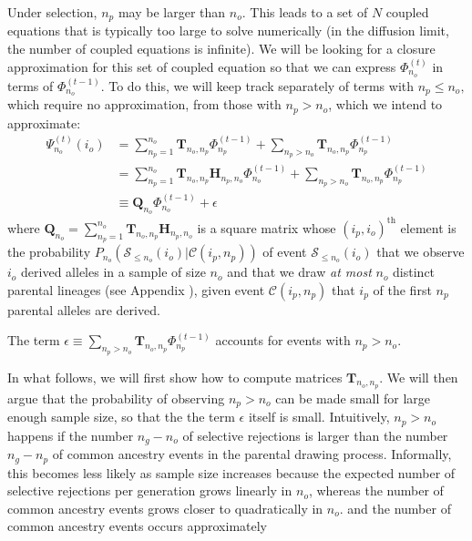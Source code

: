 \documentclass[9pt,twocolumn,twoside,lineno]{gsajnl}
\newcommand{\afs}[2]{\Phi_{#1}^{(#2)}}
\newcommand{\afsPsi}[2]{\Psi_{#1}^{(#2)}}
\newcommand{\ms}{\mathcal{S}}
\begin{document}
Under selection, $n_{p}$ may be larger than $n_o$. This leads to a set of $N$ coupled equations that is typically too large to solve numerically (in the diffusion limit, the number of coupled equations is
infinite). We will be looking for a closure approximation for this set of coupled equation so that we can express $\afs{n_o}{t}$ in terms of $\afs{n_o}{t-1}$. To do this, we will keep track separately of terms with $n_p \leq n_o,$ which require no approximation, from those with $n_p>n_o$, which we intend to approximate:   
\begin{equation}
\begin{split}
  \afsPsi{n_o}{t}(i_o)
  &= \sum_{n_p=1}^{n_{o}} \mathbf{T}_{n_o,n_p}  \afs{n_p}{t-1}+ \sum_{n_p> n_o }  \mathbf{T}_{n_o,n_p} \afs{n_p}{t-1} \\
  &=      \sum_{n_p=1}^{n_{o}} \mathbf{T}_{n_o,n_p} \mathbf{H}_{n_p,n_o} \afs{n_o}{t-1}+ \sum_{n_p> n_o }  \mathbf{T}_{n_o,n_p} \afs{n_p}{t-1} \\
  &\equiv \mathbf{Q}_{n_o}                                               \afs{n_o}{t-1}+ \epsilon
\end{split}
\label{eq_truncated}
\end{equation}
where $\mathbf{Q}_{n_o} =  \sum_{n_p=1}^{n_{o}} \mathbf{T}_{n_o,n_p} \mathbf{H}_{n_p,n_o}$ is a
square matrix whose $(i_p,i_o)^\text{th}$ element is the probability $P_{n_o}(\mathcal{S}_{\leq n_o}
(i_o)| \mathcal{C}(i_p,n_p))$ of event $\ms_{\leq n_o}(i_o)$ that we observe $i_o$ derived alleles
in a sample of size $n_o$ and that we draw \emph{at most} $n_o$ distinct parental lineages (see
Appendix ), given event $\mathcal{C}(i_p,n_p)$ that $i_p$ of the first
$n_p$ parental alleles are derived.  

The term $\epsilon \equiv \sum_{n_p> n_o}  \mathbf{T}_{n_o,n_p} \afs{n_p}{t-1} $ 
accounts for events with $n_p>n_o.$ 

In what follows, we will first show how to compute matrices $\mathbf{T}_{n_o,n_p}.$ We will then argue that the probability of observing $n_p>n_o$ can be made small for large enough sample size, so that the the term $\epsilon$ itself is small.  Intuitively, $n_p>n_o$ happens if the number $n_g-n_o$ of selective rejections is larger than the number $n_g-n_p$ of common ancestry events in the parental drawing process.  Informally, this becomes less likely as sample size increases because the expected number of selective rejections per generation grows linearly in $n_o$, whereas the number of common ancestry events grows closer to quadratically in $n_o$. 
and the number of common ancestry events occurs approximately
\end{document}
